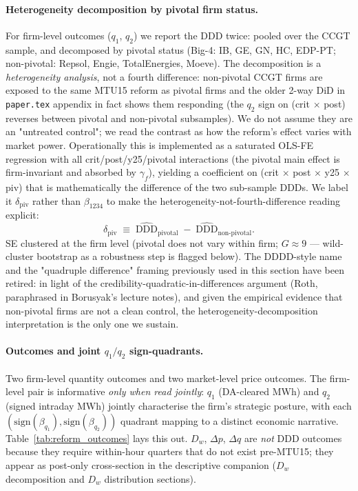 \documentclass[11pt,a4paper]{article}
\newcommand{\code}[1]{\nolinkurl{#1}}
\begin{document}
\paragraph{Heterogeneity decomposition by pivotal firm status.}
For firm-level outcomes ($q_1$, $q_2$) we report the DDD twice: pooled over the CCGT sample, and decomposed by pivotal status (Big-4: IB, GE, GN, HC, EDP-PT; non-pivotal: Repsol, Engie, TotalEnergies, Moeve). The decomposition is a \emph{heterogeneity analysis}, not a fourth difference: non-pivotal CCGT firms are exposed to the same MTU15 reform as pivotal firms and the older 2-way DiD in \code{paper.tex} appendix in fact shows them responding (the $q_2$ sign on (crit $\times$ post) reverses between pivotal and non-pivotal subsamples). We do not assume they are an "untreated control"; we read the contrast as how the reform's effect varies with market power. Operationally this is implemented as a saturated OLS-FE regression with all crit/post/y25/pivotal interactions (the pivotal main effect is firm-invariant and absorbed by $\gamma_f$), yielding a coefficient on (crit $\times$ post $\times$ y25 $\times$ piv) that is mathematically the difference of the two sub-sample DDDs. We label it $\delta_{\text{piv}}$ rather than $\beta_{1234}$ to make the heterogeneity-not-fourth-difference reading explicit:
\[
  \delta_{\text{piv}} \;\equiv\; \widehat{\text{DDD}}_{\text{pivotal}} \;-\; \widehat{\text{DDD}}_{\text{non-pivotal}}.
\]
SE clustered at the firm level (pivotal does not vary within firm; $G \approx 9$ --- wild-cluster bootstrap as a robustness step is flagged below). The DDDD-style name and the "quadruple difference" framing previously used in this section have been retired: in light of the credibility-quadratic-in-differences argument (Roth, paraphrased in Borusyak's lecture notes), and given the empirical evidence that non-pivotal firms are not a clean control, the heterogeneity-decomposition interpretation is the only one we sustain.

\paragraph{Outcomes and joint $q_1 / q_2$ sign-quadrants.}
Two firm-level quantity outcomes and two market-level price outcomes. The firm-level pair is informative \emph{only when read jointly}: $q_1$ (DA-cleared MWh) and $q_2$ (signed intraday MWh) jointly characterise the firm's strategic posture, with each $(\text{sign}(\beta_{q_1}), \text{sign}(\beta_{q_2}))$ quadrant mapping to a distinct economic narrative. Table~\ref{tab:reform_outcomes} lays this out. $D_w$, $\Delta p$, $\Delta q$ are \emph{not} DDD outcomes because they require within-hour quarters that do not exist pre-MTU15; they appear as post-only cross-section in the descriptive companion ($D_w$ decomposition and $D_w$ distribution sections).
\end{document}

